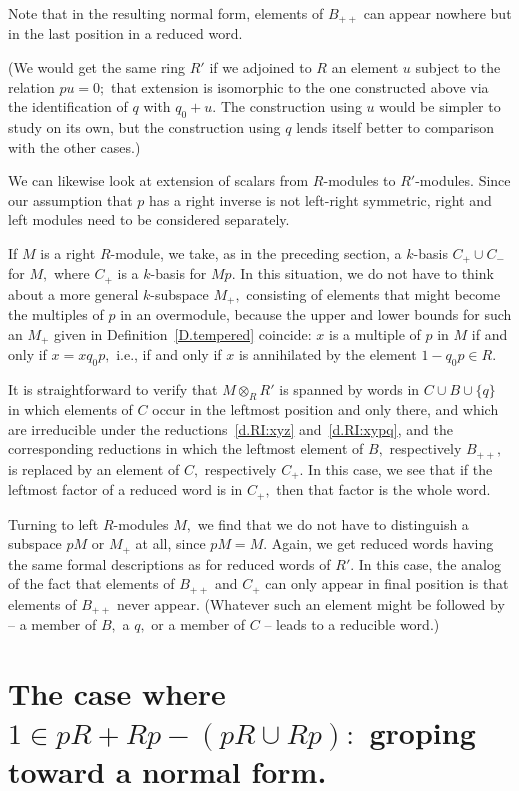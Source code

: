 \documentclass{amsart}
\begin{document}
Note that in the resulting normal form, elements of $B_{++}$ can
appear nowhere but in the last position in a reduced word.

(We would get the same ring $R'$ if we adjoined
to $R$ an element $u$ subject to the relation $pu=0;$
that extension is isomorphic to the one constructed above via
the identification of $q$ with $q_0+u.$
The construction using $u$ would be simpler to study on
its own, but the construction using $q$ lends itself better
to comparison with the other cases.)

We can likewise look at extension of scalars
from $\!R\!$-modules to $\!R'\!$-modules.
Since our assumption that $p$ has a right inverse is not
left-right symmetric, right and left modules
need to be considered separately.

If $M$ is a right $\!R\!$-module, we take, as in the preceding
section, a $\!k\!$-basis $C_+\cup C_-$ for $M,$ where $C_+$ is a
$\!k\!$-basis for $Mp.$
In this situation, we do not have to think about a more general
$\!k\!$-subspace $M_+,$ consisting of elements that might
become the multiples of $p$ in an overmodule, because the upper
and lower bounds for such an $M_+$ given
in Definition~\ref{D.tempered} coincide:
$x$ is a multiple of $p$ in $M$
if and only if $x=x q_0 p,$ i.e., if and only
if $x$ is annihilated by the element $1-q_0 p\in R.$

It is straightforward to
verify that $M\otimes_R R'$ is spanned by words in $C\cup B\cup \{q\}$
in which elements of $C$ occur in the leftmost position and only there,
and which are irreducible under the reductions~\eqref{d.RI:xyz}
and~\eqref{d.RI:xypq}, and the corresponding reductions in
which the leftmost element of $B,$ respectively $B_{++},$
is replaced by an element of $C,$ respectively $C_+.$
In this case, we see that if the leftmost factor of
a reduced word is in $C_+,$ then that factor is the whole word.

Turning to left $\!R\!$-modules $M,$ we find that we do not
have to distinguish a subspace $pM$ or $M_+$ at all, since $pM=M.$
Again, we get reduced words having the same formal descriptions as
for reduced words of $R'.$
In this case, the analog of the fact that elements of $B_{++}$
and $C_+$ can only appear in final position is that elements of $B_{++}$
never appear.
(Whatever such an element might be followed by -- a member of $B,$
a $q,$ or a member of $C$ -- leads to a reducible word.)

\section{The case where $1\in pR+Rp - (pR\cup Rp):$ groping toward a normal form.}\label{S.1=}
\end{document}
